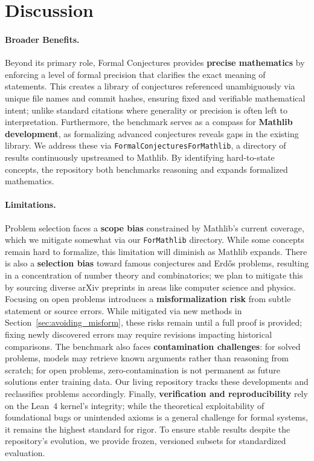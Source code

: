\section{Discussion}\label{sec:discussion}


\paragraph{Broader Benefits.}
Beyond its primary role, Formal Conjectures provides \textbf{precise mathematics} by enforcing a level of formal precision that clarifies the exact meaning of statements.
This creates a library of conjectures referenced unambiguously via unique file names and commit hashes, ensuring fixed and verifiable mathematical intent; unlike standard citations where generality or precision is often left to interpretation.
Furthermore, the benchmark serves as a compass for \textbf{Mathlib development}, as formalizing advanced conjectures reveals gaps in the existing library.
We address these via \texttt{FormalConjecturesForMathlib}, a directory of results continuously upstreamed to Mathlib. By identifying hard-to-state concepts, the repository both benchmarks reasoning and expands formalized mathematics.


\paragraph{Limitations.}
Problem selection faces a \textbf{scope bias} constrained by Mathlib's current coverage, which we mitigate somewhat via our \texttt{ForMathlib} directory. While some concepts remain hard to formalize, this limitation will diminish as Mathlib expands.
There is also a \textbf{selection bias} toward famous conjectures and Erd\H{o}s problems, resulting in a concentration of number theory and combinatorics; we plan to mitigate this by sourcing diverse arXiv preprints in areas like computer science and physics.
Focusing on open problems introduces a \textbf{misformalization risk} from subtle statement or source errors.
While mitigated via new methods in Section~\ref{sec:avoiding_misform}, these risks remain until a full proof is provided; fixing newly discovered errors may require revisions impacting historical comparisons.
The benchmark also faces \textbf{contamination challenges}: for solved problems, models may retrieve known arguments rather than reasoning from scratch; for open problems, zero-contamination is not permanent as future solutions enter training data.
Our living repository tracks these developments and reclassifies problems accordingly.
Finally, \textbf{verification and reproducibility} rely on the Lean~4 kernel's integrity; while the theoretical exploitability of foundational bugs or unintended axioms is a general challenge for formal systems, it remains the highest standard for rigor.
To ensure stable results despite the repository's evolution, we provide frozen, versioned subsets for standardized evaluation.


